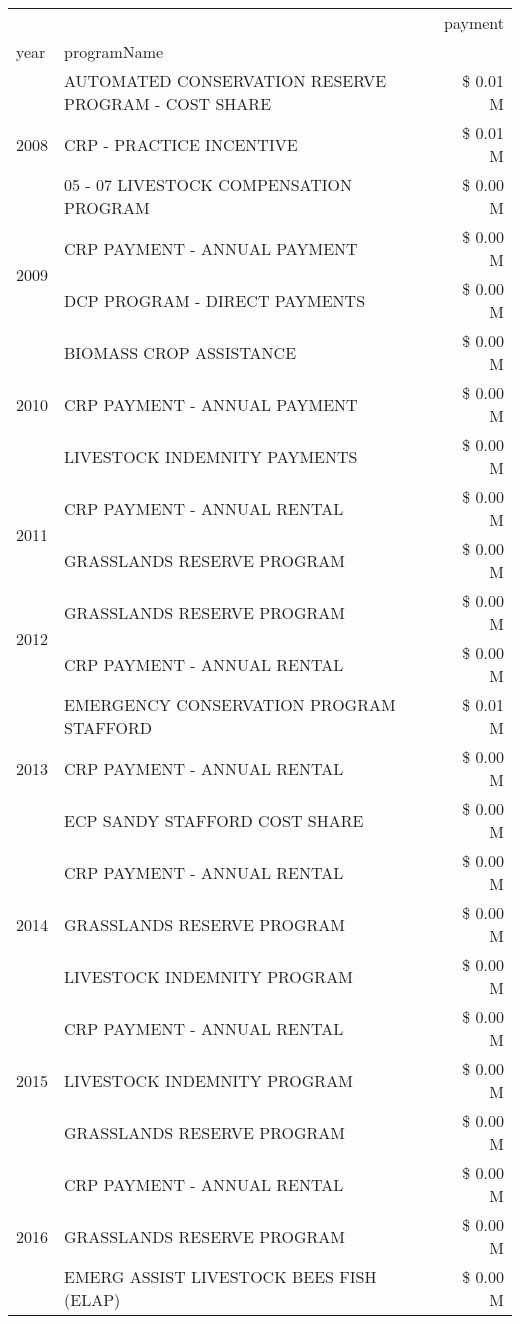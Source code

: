 \begin{tabular}{llr}
\toprule
 &  & payment \\
year & programName &  \\
\midrule
\multirow[t]{3}{*}{2008} & AUTOMATED CONSERVATION RESERVE PROGRAM - COST SHARE & \$ 0.01 M \\
 & CRP - PRACTICE INCENTIVE & \$ 0.01 M \\
 & 05 - 07 LIVESTOCK COMPENSATION PROGRAM & \$ 0.00 M \\
\cline{1-3}
\multirow[t]{2}{*}{2009} & CRP PAYMENT - ANNUAL PAYMENT & \$ 0.00 M \\
 & DCP PROGRAM - DIRECT PAYMENTS & \$ 0.00 M \\
\cline{1-3}
\multirow[t]{3}{*}{2010} & BIOMASS CROP ASSISTANCE & \$ 0.00 M \\
 & CRP PAYMENT - ANNUAL PAYMENT & \$ 0.00 M \\
 & LIVESTOCK INDEMNITY PAYMENTS & \$ 0.00 M \\
\cline{1-3}
\multirow[t]{2}{*}{2011} & CRP PAYMENT - ANNUAL RENTAL & \$ 0.00 M \\
 & GRASSLANDS RESERVE PROGRAM & \$ 0.00 M \\
\cline{1-3}
\multirow[t]{2}{*}{2012} & GRASSLANDS RESERVE PROGRAM & \$ 0.00 M \\
 & CRP PAYMENT - ANNUAL RENTAL & \$ 0.00 M \\
\cline{1-3}
\multirow[t]{3}{*}{2013} & EMERGENCY CONSERVATION PROGRAM STAFFORD & \$ 0.01 M \\
 & CRP PAYMENT - ANNUAL RENTAL & \$ 0.00 M \\
 & ECP SANDY STAFFORD COST SHARE & \$ 0.00 M \\
\cline{1-3}
\multirow[t]{3}{*}{2014} & CRP PAYMENT - ANNUAL RENTAL & \$ 0.00 M \\
 & GRASSLANDS RESERVE PROGRAM & \$ 0.00 M \\
 & LIVESTOCK INDEMNITY PROGRAM & \$ 0.00 M \\
\cline{1-3}
\multirow[t]{3}{*}{2015} & CRP PAYMENT - ANNUAL RENTAL & \$ 0.00 M \\
 & LIVESTOCK INDEMNITY PROGRAM & \$ 0.00 M \\
 & GRASSLANDS RESERVE PROGRAM & \$ 0.00 M \\
\cline{1-3}
\multirow[t]{3}{*}{2016} & CRP PAYMENT - ANNUAL RENTAL & \$ 0.00 M \\
 & GRASSLANDS RESERVE PROGRAM & \$ 0.00 M \\
 & EMERG ASSIST LIVESTOCK BEES FISH (ELAP) & \$ 0.00 M \\

\end{tabular}

